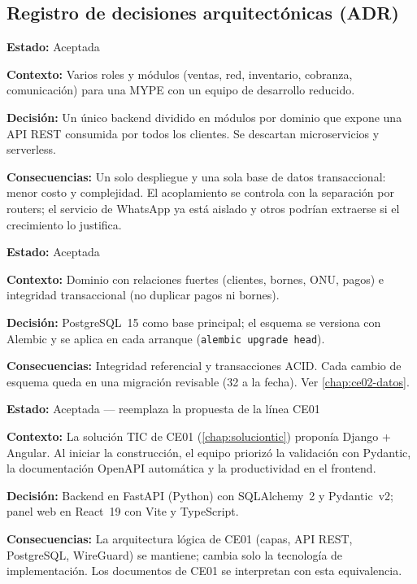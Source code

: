 \subsection{Registro de decisiones arquitectónicas (ADR)}
\label{sec:ce02-adr}

\newcommand{\adr}[6]{%
\begin{tcolorbox}[enhanced,breakable,colback=white,colframe=upeublue!60,boxrule=0.5pt,arc=1pt,
  left=6pt,right=6pt,top=4pt,bottom=4pt,title={\small\textbf{#1} --- #2},coltitle=upeublue,colbacktitle=upeublue!8]
\small\textbf{Estado:} #3\par
\textbf{Contexto:} #4\par
\textbf{Decisión:} #5\par
\textbf{Consecuencias:} #6
\end{tcolorbox}}

\adr{ADR-01}{Monolito modular con API REST}{Aceptada}
{Varios roles y módulos (ventas, red, inventario, cobranza, comunicación) para una MYPE con un equipo de desarrollo reducido.}
{Un único backend dividido en módulos por dominio que expone una API REST consumida por todos los clientes. Se descartan microservicios y serverless.}
{Un solo despliegue y una sola base de datos transaccional: menor costo y complejidad. El acoplamiento se controla con la separación por routers; el servicio de WhatsApp ya está aislado y otros podrían extraerse si el crecimiento lo justifica.}

\adr{ADR-02}{PostgreSQL con migraciones Alembic}{Aceptada}
{Dominio con relaciones fuertes (clientes, bornes, ONU, pagos) e integridad transaccional (no duplicar pagos ni bornes).}
{PostgreSQL~15 como base principal; el esquema se versiona con Alembic y se aplica en cada arranque (\texttt{alembic upgrade head}).}
{Integridad referencial y transacciones ACID. Cada cambio de esquema queda en una migración revisable (32 a la fecha). Ver \cref{chap:ce02-datos}.}

\adr{ADR-03}{FastAPI y React en lugar de Django y Angular}{Aceptada --- reemplaza la propuesta de la línea CE01}
{La solución TIC de CE01 (\cref{chap:soluciontic}) proponía Django + Angular. Al iniciar la construcción, el equipo priorizó la validación con Pydantic, la documentación OpenAPI automática y la productividad en el frontend.}
{Backend en FastAPI (Python) con SQLAlchemy~2 y Pydantic~v2; panel web en React~19 con Vite y TypeScript.}
{La arquitectura lógica de CE01 (capas, API REST, PostgreSQL, WireGuard) se mantiene; cambia solo la tecnología de implementación. Los documentos de CE01 se interpretan con esta equivalencia.}

